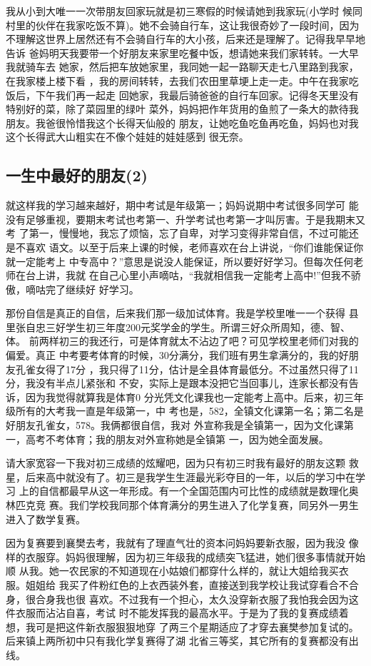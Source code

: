 \documentclass[12pt]{book}
\begin{document}
        我从小到大唯一一次带朋友回家玩就是初三寒假的时候请她到我家玩(小学时
候同村里的伙伴在我家吃饭不算)。她不会骑自行车，这让我很奇妙了一段时间，因为
不理解这世界上居然还有不会骑自行车的大小孩，后来还是理解了。记得我早早地告诉
爸妈明天我要带一个好朋友来家里吃餐中饭，想请她来我们家转转。一大早我就骑车去
她家，然后把车放她家里，我同她一起一路聊天走七八里路到我家，在我家楼上楼下看
，我的房间转转，去我们农田里草埂上走一走。中午在我家吃饭后，下午我们再一起走
回她家，我最后骑爸爸的自行车回家。记得冬天里没有特别好的菜，除了菜园里的绿叶
菜外，妈妈把作年货用的鱼煎了一条大的款待我朋友。我爸很怜惜我这个长得天仙般的
朋友，让她吃鱼吃鱼再吃鱼，妈妈也对我这个长得武大山粗实在不像个娃娃的娃娃感到
很无奈。
\subsection{一生中最好的朋友(2)}
\label{sec-2-6-2}

        就这样我的学习越来越好，期中考试是年级第一；妈妈说期中考试很多同学可
能没有足够重视，要期末考试也考第一、升学考试也考第一才叫厉害。于是我期末又考
了第一，慢慢地，我忘了烦恼，忘了自卑，对学习变得非常自信，不过可能还是不喜欢
语文。以至于后来上课的时候，老师喜欢在台上讲说，“你们谁能保证你就一定能考上
中专高中？”意思是说没人能保证，所以要好好学习。但每次任何老师在台上讲，我就
在自己心里小声嘀咕，“我就相信我一定能考上高中!”但我不骄傲，嘀咕完了继续好
好学习。

        那份自信是真正的自信，后来我们那一级加试体育。我是学校里唯一一个获得
县里张自忠三好学生初三年度200元奖学金的学生。所谓三好众所周知，德、智、体。
前两样初三的我还行，可是体育就太不沾边了吧？可见学校里老师们对我的偏爱。真正
中考要考体育的时候，30分满分，我们班有男生拿满分的，我的好朋友孔雀女得了17分
，我只得了11分，估计是全县体育最低分。不过虽然只得了11分，我没有半点儿紧张和
不安，实际上是跟本没把它当回事儿，连家长都没有告诉，因为我觉得就算我是体育0
分光凭文化课我也一定能考上高中。后来，初三年级所有的大考我一直是年级第一，中
考也是，582，全镇文化课第一名；第二名是好朋友孔雀女，578。我俩都很自信，我对
外宣称我是全镇第一，因为文化课第一，高考不考体育；我的朋友对外宣称她是全镇第
一，因为她全面发展。

        请大家宽容一下我对初三成绩的炫耀吧，因为只有初三时我有最好的朋友这颗
救星，后来高中就没有了。初三是我学生生涯最光彩夺目的一年，以后的学习中在学习
上的自信都最早从这一年形成。有一个全国范围内可比性的成绩就是数理化奥林匹克竞
赛。我们学校我同那个体育满分的男生进入了化学复赛，同另外一男生进入了数学复赛。

        因为复赛要到襄樊去考，我就有了理直气壮的资本问妈妈要新衣服，因为我没
像样的衣服穿。妈妈很理解，因为初三年级我的成绩突飞猛进，她们很多事情就开始顺
从我。她一农民家的不知道现在小姑娘们都穿什么样的，就让大姐给我买衣服。姐姐给
我买了件粉红色的上衣西装外套，直接送到我学校让我试穿看合不合身，很合身我也很
喜欢。不过我有一个担心，太久没穿新衣服了我怕我会因为这件衣服而沾沾自喜，考试
时不能发挥我的最高水平。于是为了我的复赛成绩着想，我可是把这件新衣服狠狠地穿
了两三个星期适应了才穿去襄樊参加复试的。后来镇上两所初中只有我化学复赛得了湖
北省三等奖，其它所有的复赛都没有出线。
\end{document}
